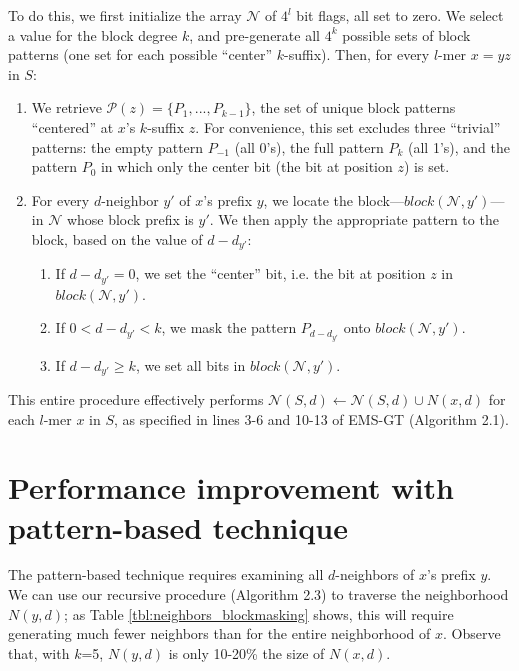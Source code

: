 \documentclass[oneside,12pt]{DISCSthesis}
\begin{document}
{	To do this, we first initialize the array $\mathcal{N}$ of $4^l$ bit flags, all set to zero. We select a value for the block degree $k$, and pre-generate all $4^k$ possible sets of block patterns (one set for each possible ``center'' $k$-suffix). Then, for every $l$-mer $x = yz$ in $S$:
		\begin{enumerate}
			\item We retrieve $\mathcal{P}(z) = \{P_{1}, ... , P_{k-1}\}$, the set of unique block patterns ``centered'' at $x$'s $k$-suffix $z$. For convenience, this set excludes three ``trivial'' patterns: the empty pattern $P_{-1}$ (all 0's), the full pattern $P_{k}$ (all 1's), and the pattern $P_{0}$ in which only the center bit (the bit at position $z$) is set.
			\item For every $d$-neighbor $y'$ of $x$'s prefix $y$, we locate the block---$block(\mathcal{N}, y')$---in $\mathcal{N}$ whose block prefix is $y'$. We then apply the appropriate pattern to the block, based on the value of $d - d_{y'}$:
			\begin{enumerate}
				\item If $d - d_{y'} = 0$, we set the ``center'' bit, i.e. the bit at position $z$ in $block(\mathcal{N}, y')$.
				\item If $0 < d - d_{y'} < k$, we mask the pattern $P_{d - d_{y'}}$ onto $block(\mathcal{N}, y')$.
				\item If $d - d_{y'} \geq k$, we set all bits in $block(\mathcal{N}, y')$.
			\end{enumerate}
		\end{enumerate}

	\noindent This entire procedure effectively performs $\mathcal{N}(S,d) \leftarrow \mathcal{N}(S,d) \cup N(x,d)$ for each $l$-mer $x$ in $S$, as specified in lines 3-6 and 10-13 of EMS-GT (Algorithm 2.1).

	\section{Performance improvement with pattern-based technique}
	The pattern-based technique requires examining all $d$-neighbors of $x$'s prefix $y$.%
	We can use our recursive procedure (Algorithm 2.3) to traverse the neighborhood $N(y,d)$; as Table \ref{tbl:neighbors_blockmasking} shows, this will require generating much fewer neighbors than for the entire neighborhood of $x$. Observe that, with $k$=5, $N(y,d)$ is only 10-20\% the size of $N(x,d)$. \newline

}
\end{document}
